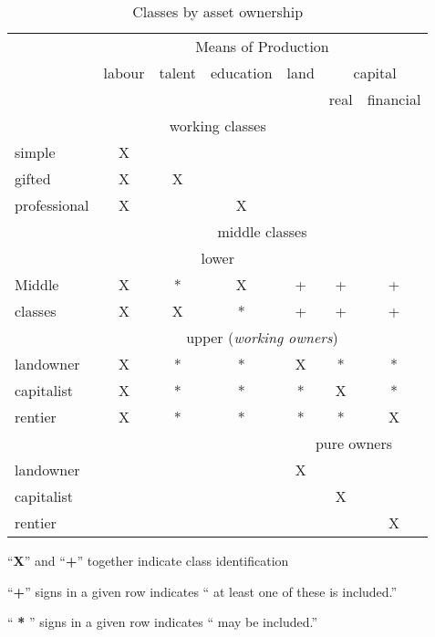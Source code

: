 \begin{table}[!ht]
    \begin{centering}
\begin{tabular}{lcccccc}\small
  
    & \multicolumn{6}{c}{Means of Production}\\   \cline{2-7}
     &labour &talent & education& land & \multicolumn{2}{c}{capital} \\ \cline{6-7}
     &       &       &          &       &real   &financial  \\ 
     \hline
      \multicolumn{7}{c}{working classes}\\
simple& X   &       &         &         &       &\\
gifted& X   &    X  &         &         &       &\\
professional& X   &       &    X   &         &       &\\\hline
& \multicolumn{6}{c}{middle classes}\\  
   \multicolumn{7}{c}{lower}\\
Middle  & X   & * & X  & +&  + & +\\
classes & X   & X & *  & + & + & +\\\hline

 & \multicolumn{6}{c}{upper (\textit{working owners})}\\
landowner & X  &   *   & * &   X   &   *  & * \\
capitalist& X  &   *   & * &   *   &   X &  *\\
rentier   & X  &   *   & * &   *   &   * & X\\\hline

&&&& \multicolumn{3}{c}{pure owners}\\
landowner  &   &  & &   X  &       &\\
capitalist &   &  &  &     & X  &\\
rentier    &   &  &  &     &   & X\\ \hline
\end{tabular}
\end{centering}
\vspace{.25cm}

``\textbf{X}'' and ``\textbf{+}'' together indicate class identification

``\textbf{+}'' signs in a given row indicates `` at least one of these is included.''

\noindent``\textbf{ * }'' signs in a given row indicates `` may be included.''
\caption{Classes by asset ownership}
\label{table-classes}
\end{table}
% 
% 
% 



